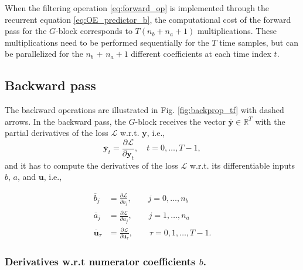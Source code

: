 \documentclass{article}
\newcommand{\ac}{a} %
\newcommand{\bb}{b} %
\newcommand{\adjoint}[1]{\overline{#1}}
\newcommand{\tvec}[1]{\mathbf{#1}}
\newcommand{\nsamp}{T}
\newcommand{\pdiff}[2]{\frac{\partial #1}{\partial #2}}
\newcommand{\loss}{\mathcal{L}}
\begin{document}
When the filtering operation \eqref{eq:forward_op} is implemented through the recurrent equation \eqref{eq:OE_predictor_b}, the computational cost of the forward pass for the  $G$-block corresponds to $\nsamp(n_\bb + n_\ac + 1)$ multiplications. These multiplications  need to be performed sequentially for the $\nsamp$ time samples, but can be parallelized for the $n_\bb$ + $n_\ac + 1$ different coefficients at each time index $t$.

\subsection{Backward pass}
The backward operations are illustrated in Fig.  \ref{fig:backprop_tf} with dashed arrows. 
In the {backward pass}, the $G$-block receives the vector $\adjoint{\tvec{y}} \in \mathbb{R}^{\nsamp}$ with the partial derivatives of the loss $\loss$ w.r.t. $\tvec{y}$, i.e., 
\begin{equation}
\adjoint{\tvec{y}}_t = \pdiff{\loss}{\tvec{y}_t},\quad  t=0,\dots,\nsamp-1,  
\end{equation}
and  it has to compute the derivatives of the loss $\loss$ w.r.t. its differentiable inputs  $\bb$, $\ac$, and $\tvec{u}$, i.e., 

\begin{subequations}
	\begin{align} 
	\adjoint{\bb}_j &= \pdiff{\loss}{\bb_j},\qquad j=0,\dots,n_\bb \\
	\adjoint{\ac}_j &= \pdiff{\loss}{\ac_j},\qquad j=1,\dots,n_\ac\\
	\adjoint{\tvec{u}}_\tau &= \pdiff{\loss}{\tvec{u}_\tau},\qquad \tau=0,1,\dots,\nsamp\!-\!1. \label{eq:adjsensu}
	\end{align}
\end{subequations}

\subsubsection{{Derivatives w.r.t} numerator coefficients $\bb$.} 
\end{document}
